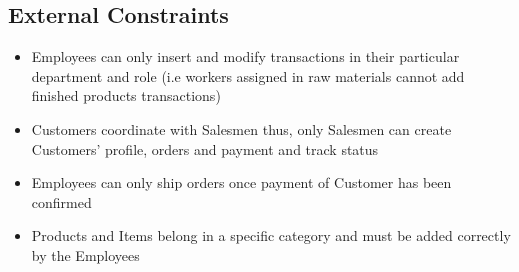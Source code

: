 \subsection{External Constraints}
\begin{itemize}
\item Employees can only insert and modify transactions in their particular department and role (i.e workers assigned in raw materials cannot add finished products transactions)
\item Customers coordinate with Salesmen thus, only Salesmen can create Customers' profile, orders and payment and track status
\item Employees can only ship orders once payment of Customer has been confirmed
\item Products and Items belong in a specific category and must be added correctly by the Employees
\end{itemize}